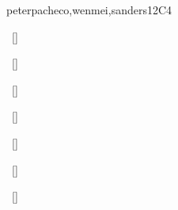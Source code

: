 \begin{syllabus}
\begin{unit}{\PDParallelArchitecture}{}{peterpacheco,wenmei,sanders}{12}{C4}
\begin{topics}%
    \item \PDParallelArchitectureTopicMulticore
    \item \PDParallelArchitectureTopicShared
    \item \PDParallelArchitectureTopicSymmetric
    \item \PDParallelArchitectureTopicSimd
    \item \PDParallelArchitectureTopicGpu
    \item \PDParallelArchitectureTopicFlynns
    \item \PDParallelArchitectureTopicInstruction
    \item \PDParallelArchitectureTopicMemory
    \item \PDParallelArchitectureTopicTopologies
\end{topics}
\begin{learningoutcomes}%
    \item \PDParallelArchitectureLOExplainTheShared~[\Assessment] %
    \item \PDParallelArchitectureLODescribeTheAndKey~[\Assessment] %
    \item \PDParallelArchitectureLOCharacterizeTheTasks~[\Usage] %
    \item \PDParallelArchitectureLODescribeTheLimitationsVs~[\Usage] %
    \item \PDParallelArchitectureLOExplainTheEach~[\Usage] %
    \item \PDParallelArchitectureLODescribeTheMaintaining~[\Familiarity] %
    \item \PDParallelArchitectureLODescribeTheChallenges~[\Familiarity] %
\end{learningoutcomes}%
\end{unit}


\end{syllabus}

